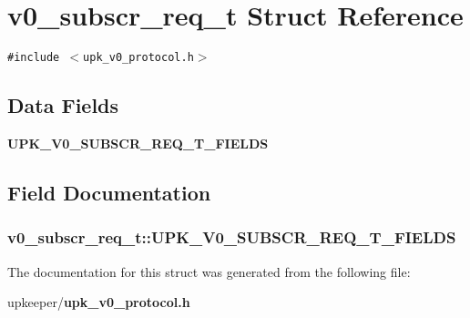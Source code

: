 \section{v0\_\-subscr\_\-req\_\-t Struct Reference}
\label{structv0__subscr__req__t}
{\tt \#include $<$upk\_\-v0\_\-protocol.h$>$}

\subsection*{Data Fields}
\begin{CompactItemize}
\item 
\bf{UPK\_\-V0\_\-SUBSCR\_\-REQ\_\-T\_\-FIELDS}
\end{CompactItemize}


\subsection{Field Documentation}
\subsubsection{\setlength{\rightskip}{0pt plus 5cm}\bf{v0\_\-subscr\_\-req\_\-t::UPK\_\-V0\_\-SUBSCR\_\-REQ\_\-T\_\-FIELDS}}\label{structv0__subscr__req__t_d1ec993735d97768d55abbc34dfe663d}




The documentation for this struct was generated from the following file:\begin{CompactItemize}
\item 
upkeeper/\bf{upk\_\-v0\_\-protocol.h}\end{CompactItemize}
